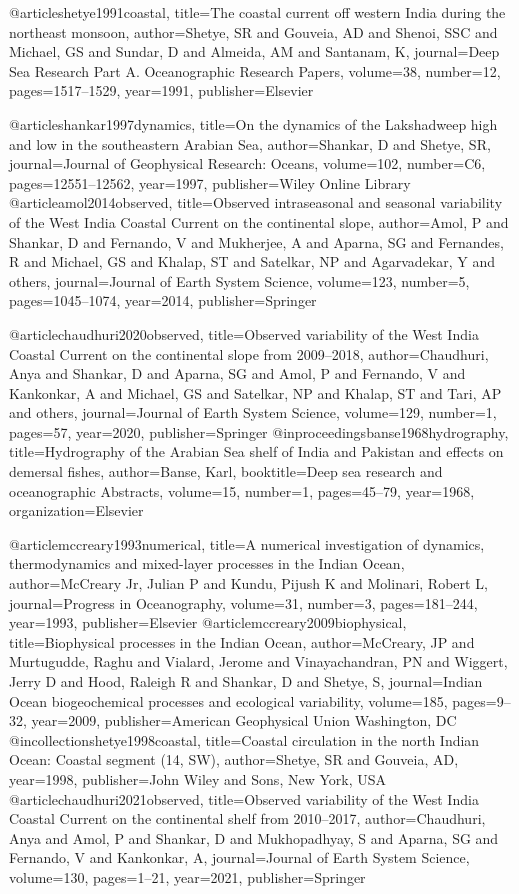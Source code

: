 @article{shetye1991coastal,
	title={The coastal current off western India during the northeast monsoon},
	author={Shetye, SR and Gouveia, AD and Shenoi, SSC and Michael, GS and Sundar, D and Almeida, AM and Santanam, K},
	journal={Deep Sea Research Part A. Oceanographic Research Papers},
	volume={38},
	number={12},
	pages={1517--1529},
	year={1991},
	publisher={Elsevier}
}

@article{shankar1997dynamics,
	title={On the dynamics of the Lakshadweep high and low in the southeastern Arabian Sea},
	author={Shankar, D and Shetye, SR},
	journal={Journal of Geophysical Research: Oceans},
	volume={102},
	number={C6},
	pages={12551--12562},
	year={1997},
	publisher={Wiley Online Library}
}
@article{amol2014observed,
	title={Observed intraseasonal and seasonal variability of the West India Coastal Current on the continental slope},
	author={Amol, P and Shankar, D and Fernando, V and Mukherjee, A and Aparna, SG and Fernandes, R and Michael, GS and Khalap, ST and Satelkar, NP and Agarvadekar, Y and others},
	journal={Journal of Earth System Science},
	volume={123},
	number={5},
	pages={1045--1074},
	year={2014},
	publisher={Springer}
}

@article{chaudhuri2020observed,
	title={Observed variability of the West India Coastal Current on the continental slope from 2009--2018},
	author={Chaudhuri, Anya and Shankar, D and Aparna, SG and Amol, P and Fernando, V and Kankonkar, A and Michael, GS and Satelkar, NP and Khalap, ST and Tari, AP and others},
	journal={Journal of Earth System Science},
	volume={129},
	number={1},
	pages={57},
	year={2020},
	publisher={Springer}
}
@inproceedings{banse1968hydrography,
	title={Hydrography of the Arabian Sea shelf of India and Pakistan and effects on demersal fishes},
	author={Banse, Karl},
	booktitle={Deep sea research and oceanographic Abstracts},
	volume={15},
	number={1},
	pages={45--79},
	year={1968},
	organization={Elsevier}
}

@article{mccreary1993numerical,
	title={A numerical investigation of dynamics, thermodynamics and mixed-layer processes in the Indian Ocean},
	author={McCreary Jr, Julian P and Kundu, Pijush K and Molinari, Robert L},
	journal={Progress in Oceanography},
	volume={31},
	number={3},
	pages={181--244},
	year={1993},
	publisher={Elsevier}
}
@article{mccreary2009biophysical,
	title={Biophysical processes in the Indian Ocean},
	author={McCreary, JP and Murtugudde, Raghu and Vialard, Jerome and Vinayachandran, PN and Wiggert, Jerry D and Hood, Raleigh R and Shankar, D and Shetye, S},
	journal={Indian Ocean biogeochemical processes and ecological variability},
	volume={185},
	pages={9--32},
	year={2009},
	publisher={American Geophysical Union Washington, DC}
}
@incollection{shetye1998coastal,
	title={Coastal circulation in the north Indian Ocean: Coastal segment (14, SW)},
	author={Shetye, SR and Gouveia, AD},
	year={1998},
	publisher={John Wiley and Sons, New York, USA}
}
@article{chaudhuri2021observed,
	title={Observed variability of the West India Coastal Current on the continental shelf from 2010--2017},
	author={Chaudhuri, Anya and Amol, P and Shankar, D and Mukhopadhyay, S and Aparna, SG and Fernando, V and Kankonkar, A},
	journal={Journal of Earth System Science},
	volume={130},
	pages={1--21},
	year={2021},
	publisher={Springer}
}



